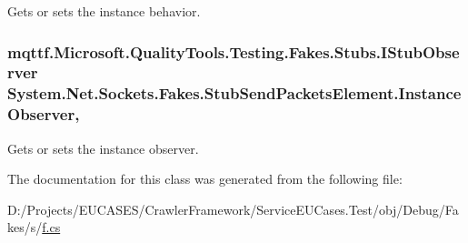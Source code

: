 Gets or sets the instance behavior.

\hypertarget{class_system_1_1_net_1_1_sockets_1_1_fakes_1_1_stub_send_packets_element_a140327df30f9fef8032b381f92805a4e}{
\subsubsection[{Instance\-Observer}]{\setlength{\rightskip}{0pt plus 5cm}mqttf.\-Microsoft.\-Quality\-Tools.\-Testing.\-Fakes.\-Stubs.\-I\-Stub\-Observer System.\-Net.\-Sockets.\-Fakes.\-Stub\-Send\-Packets\-Element.\-Instance\-Observer\hspace{0.3cm}{\ttfamily [get]}, {\ttfamily [set]}}}\label{class_system_1_1_net_1_1_sockets_1_1_fakes_1_1_stub_send_packets_element_a140327df30f9fef8032b381f92805a4e}


Gets or sets the instance observer.



The documentation for this class was generated from the following file\-:\begin{DoxyCompactItemize}
\item 
D\-:/\-Projects/\-E\-U\-C\-A\-S\-E\-S/\-Crawler\-Framework/\-Service\-E\-U\-Cases.\-Test/obj/\-Debug/\-Fakes/s/\hyperlink{s_2f_8cs}{f.\-cs}\end{DoxyCompactItemize}
